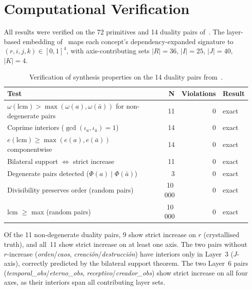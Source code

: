 \documentclass[11pt,a4paper]{article}
\begin{document}
\section{Computational Verification}
\label{sec:computation}

All results were verified on the 72 primitives and 14 duality
pairs of~\citet{p4}. The layer-based embedding of~\citet{p11}
maps each concept's dependency-expanded signature to
$(r,i,j,k)\in[0,1]^4$, with axis-contributing sets
$|R|=36$, $|I|=25$, $|J|=40$, $|K|=4$.

\begin{table}[H]
\centering
\caption{Verification of synthesis properties on the 14 duality
pairs from~\citet{p4}.}
\label{tab:verification}
\begin{tabularx}{\textwidth}{@{}lrrl@{}}
\toprule
\textbf{Test} & \textbf{N} & \textbf{Violations} & \textbf{Result} \\
\midrule
$\omega(\mathrm{lcm})>\max(\omega(a),\omega(\bar{a}))$
  for non-degenerate pairs & 11 & 0 & exact \\
Coprime interiors ($\gcd(\iota_a,\iota_{\bar{a}})=1$)
  & 14 & 0 & exact \\
$e(\mathrm{lcm})\geq\max(e(a),e(\bar{a}))$ componentwise
  & 14 & 0 & exact \\
Bilateral support $\Leftrightarrow$ strict increase
  & 11 & 0 & exact \\
Degenerate pairs detected ($\Phi(a)\mid\Phi(\bar{a})$)
  & 3 & 0 & exact \\
\midrule
Divisibility preserves order (random pairs) & 10\,000 & 0 & exact \\
lcm $\geq$ max (random pairs) & 10\,000 & 0 & exact \\
\bottomrule
\end{tabularx}
\end{table}

Of the 11 non-degenerate duality pairs, 9 show strict increase on
$r$ (crystallised truth), and all~11 show strict increase on at
least one axis. The two pairs without $r$-increase
(\emph{orden}/\emph{caos}, \emph{creaci\'on}/\emph{destrucci\'on})
have interiors only in Layer~3 ($J$-axis), correctly predicted by
the bilateral support theorem. The two Layer~6 pairs
(\emph{temporal\_obs}/\emph{eterno\_obs},
\emph{receptivo}/\emph{creador\_obs}) show strict increase on all
four axes, as their interiors span all contributing layer sets.
\end{document}
